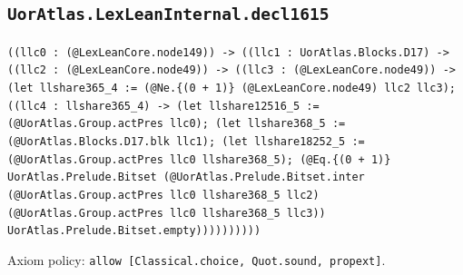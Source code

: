 \documentclass[11pt]{article}
\begin{document}
\subsection*{\texttt{UorAtlas.LexLeanInternal.decl1615}}
\noindent\texttt{((llc0 : (@LexLeanCore.node149)) -> ((llc1 : UorAtlas.Blocks.D17) -> ((llc2 : (@LexLeanCore.node49)) -> ((llc3 : (@LexLeanCore.node49)) -> (let llshare365\_4 := (@Ne.\{(0 + 1)\} (@LexLeanCore.node49) llc2 llc3); ((llc4 : llshare365\_4) -> (let llshare12516\_5 := (@UorAtlas.Group.actPres llc0); (let llshare368\_5 := (@UorAtlas.Blocks.D17.blk llc1); (let llshare18252\_5 := (@UorAtlas.Group.actPres llc0 llshare368\_5); (@Eq.\{(0 + 1)\} UorAtlas.Prelude.Bitset (@UorAtlas.Prelude.Bitset.inter (@UorAtlas.Group.actPres llc0 llshare368\_5 llc2) (@UorAtlas.Group.actPres llc0 llshare368\_5 llc3)) UorAtlas.Prelude.Bitset.empty))))))))))}\par
\noindent Axiom policy: \texttt{allow [Classical.choice, Quot.sound, propext]}.\par
\end{document}
